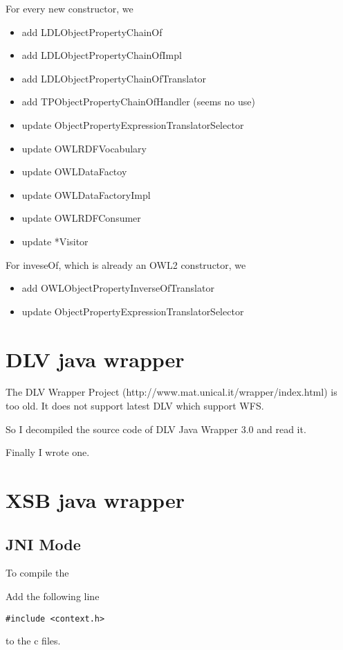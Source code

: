 \documentclass{article}
\begin{document}
 

For every new constructor, we

\begin{itemize}

\item add LDLObjectPropertyChainOf
\item add LDLObjectPropertyChainOfImpl
\item add LDLObjectPropertyChainOfTranslator 
\item add TPObjectPropertyChainOfHandler (seems no use)
\item update ObjectPropertyExpressionTranslatorSelector
\item update OWLRDFVocabulary
\item update OWLDataFactoy
\item update OWLDataFactoryImpl
\item update OWLRDFConsumer 
\item update *Visitor
\end{itemize}

For inveseOf, which is already an OWL2 constructor, we
\begin{itemize}
\item add OWLObjectPropertyInverseOfTranslator
\item update ObjectPropertyExpressionTranslatorSelector
\end{itemize}

\section{DLV java wrapper}

The DLV Wrapper Project (http://www.mat.unical.it/wrapper/index.html) is
too old. It does not support latest DLV which support WFS.

So I decompiled the source code of DLV Java Wrapper 3.0 and read it.

Finally I wrote one.

\section{XSB java wrapper}

\subsection{JNI Mode}
\label{sec:XSB-jni}

To compile the 

Add the following line
\begin{verbatim}
#include <context.h>
\end{verbatim}
to the c files.
	
\end{document}
